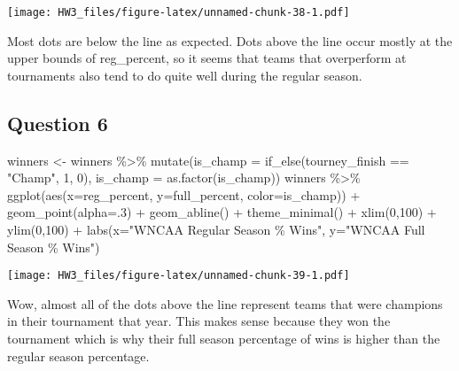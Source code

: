 \documentclass[
]{article}
\newenvironment{Shaded}{\begin{snugshade}}{\end{snugshade}}
\newcommand{\AttributeTok}[1]{\textcolor[rgb]{0.77,0.63,0.00}{#1}}
\newcommand{\DecValTok}[1]{\textcolor[rgb]{0.00,0.00,0.81}{#1}}
\newcommand{\FunctionTok}[1]{\textcolor[rgb]{0.00,0.00,0.00}{#1}}
\newcommand{\NormalTok}[1]{#1}
\newcommand{\OtherTok}[1]{\textcolor[rgb]{0.56,0.35,0.01}{#1}}
\newcommand{\SpecialCharTok}[1]{\textcolor[rgb]{0.00,0.00,0.00}{#1}}
\newcommand{\StringTok}[1]{\textcolor[rgb]{0.31,0.60,0.02}{#1}}
\begin{document}
\texttt{[image: HW3\_files/figure-latex/unnamed-chunk-38-1.pdf]}

Most dots are below the line as expected. Dots above the line occur
mostly at the upper bounds of reg\_percent, so it seems that teams that
overperform at tournaments also tend to do quite well during the regular
season.

\hypertarget{question-6-2}{%
\subsection{Question 6}\label{question-6-2}}

\begin{Shaded}
\begin{Highlighting}[]
\NormalTok{winners }\OtherTok{\textless{}{-}}\NormalTok{ winners }\SpecialCharTok{\%\textgreater{}\%} 
  \FunctionTok{mutate}\NormalTok{(}\AttributeTok{is\_champ =} \FunctionTok{if\_else}\NormalTok{(tourney\_finish }\SpecialCharTok{==} \StringTok{"Champ"}\NormalTok{, }\DecValTok{1}\NormalTok{, }\DecValTok{0}\NormalTok{), }
         \AttributeTok{is\_champ =} \FunctionTok{as.factor}\NormalTok{(is\_champ))}
\NormalTok{winners }\SpecialCharTok{\%\textgreater{}\%} \FunctionTok{ggplot}\NormalTok{(}\FunctionTok{aes}\NormalTok{(}\AttributeTok{x=}\NormalTok{reg\_percent,}
                   \AttributeTok{y=}\NormalTok{full\_percent,}
                   \AttributeTok{color=}\NormalTok{is\_champ)) }\SpecialCharTok{+}
  \FunctionTok{geom\_point}\NormalTok{(}\AttributeTok{alpha=}\NormalTok{.}\DecValTok{3}\NormalTok{) }\SpecialCharTok{+}
  \FunctionTok{geom\_abline}\NormalTok{() }\SpecialCharTok{+}
  \FunctionTok{theme\_minimal}\NormalTok{() }\SpecialCharTok{+}
  \FunctionTok{xlim}\NormalTok{(}\DecValTok{0}\NormalTok{,}\DecValTok{100}\NormalTok{) }\SpecialCharTok{+}
  \FunctionTok{ylim}\NormalTok{(}\DecValTok{0}\NormalTok{,}\DecValTok{100}\NormalTok{) }\SpecialCharTok{+}
  \FunctionTok{labs}\NormalTok{(}\AttributeTok{x=}\StringTok{"WNCAA Regular Season \% Wins"}\NormalTok{, }
       \AttributeTok{y=}\StringTok{"WNCAA Full Season \% Wins"}\NormalTok{)}
\end{Highlighting}
\end{Shaded}

\texttt{[image: HW3\_files/figure-latex/unnamed-chunk-39-1.pdf]}

Wow, almost all of the dots above the line represent teams that were
champions in their tournament that year. This makes sense because they
won the tournament which is why their full season percentage of wins is
higher than the regular season percentage.
\end{document}
